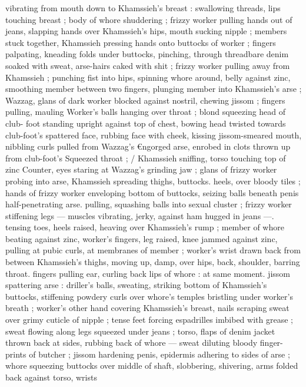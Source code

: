 vibrating from mouth down to Khamssieh's breast : swallowing 
threads, lips touching breast ; body of whore shuddering ; frizzy 
worker pulling hands out of jeans, slapping hands over Khamssieh's 
hips, mouth sucking nipple ; members stuck together, Khamssieh 
pressing hands onto buttocks of worker ; fingers palpating, kneading 
folds under buttocks, pinching, through threadbare denim soaked 
with sweat, arse-hairs caked with shit ; frizzy worker pulling away 
from Khamssieh ; punching fist into hips, spinning whore around, 
belly against zinc, smoothing member between two fingers, plunging 
member into Khamssieh's arse ; Wazzag, glans of dark worker 
blocked against nostril, chewing jissom ; fingers pulling, mauling 
Worker's balls hanging over throat ; blond squeezing head of club- 
foot standing upright against top of chest, bowing head twisted 
towards club-foot's spattered face, rubbing face with cheek, kissing 
jissom-smeared mouth, nibbling curls pulled from Wazzag's 
€ngorged arse, enrobed in clots thrown up from club-foot's 
Squeezed throat ; {\slash} Khamssieh sniffing, torso touching top of zinc 
Counter, eyes staring at Wazzag's grinding jaw ; glans of frizzy 
worker probing into arse, Khamssieh spreading thighs, buttocks. 
heels, over bloody tiles ; hands of frizzy worker enveloping bottom 
of buttocks, seizing balls beneath penis half-penetrating arse. 
pulling, squashing balls into sexual cluster ; frizzy worker stiffening 
legs --- muscles vibrating, jerky, against ham hugged in jeans ---. 
tensing toes, heels raised, heaving over Khamssieh's rump ; member 
of whore beating against zinc, worker's fingers, leg raised, knee 
jammed against zinc, pulling at pubic curls, at membranes of 
member ; worker's wrist drawn back from between Khamssieh's 
thighs, moving up, damp, over hips, back, shoulder, barring throat. 
fingers pulling ear, curling back lips of whore : at same moment. 
jissom spattering arse : driller's balls, sweating, striking bottom of 
Khamssieh's buttocks, stiffening powdery curls over whore's temples 
bristling under worker's breath ; worker's other hand covering 
Khamssieh's breast, nails scraping sweat over grimy cuticle of nipple 
; tense feet forcing espadrilles imbibed with grease ; sweat flowing 
along legs squeezed under jeans ; torso, flaps of denim jacket 
thrown back at sides, rubbing back of whore --- sweat diluting 
bloody finger-prints of butcher ; jissom hardening penis, epidermis 
adhering to sides of arse ; whore squeezing buttocks over middle of 
shaft, slobbering, shivering, arms folded back against torso, wrists 
